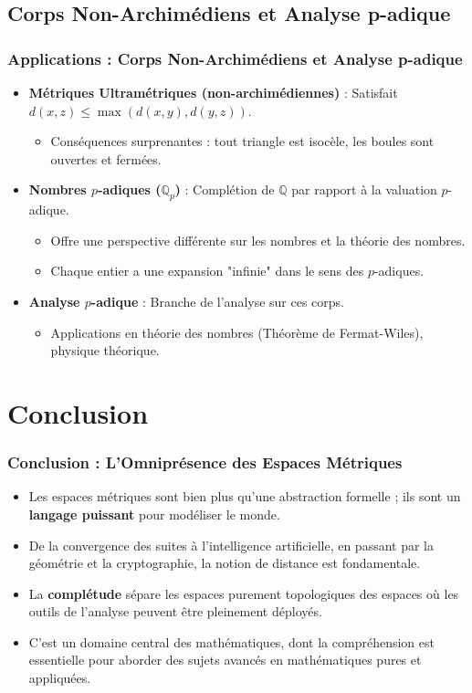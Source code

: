 \documentclass{beamer}
\begin{document}
\subsection*{Corps Non-Archimédiens et Analyse p-adique}
\begin{frame}
    \frametitle{Applications : Corps Non-Archimédiens et Analyse p-adique}
    \begin{itemize}
        \item \textbf{Métriques Ultramétriques (non-archimédiennes)} : Satisfait $d(x, z) \le \max(d(x, y), d(y, z))$.
            \begin{itemize}
                \item Conséquences surprenantes : tout triangle est isocèle, les boules sont ouvertes et fermées.
            \end{itemize}
        \item \textbf{Nombres $p$-adiques ($\mathbb{Q}_p$)} : Complétion de $\mathbb{Q}$ par rapport à la valuation $p$-adique.
            \begin{itemize}
                \item Offre une perspective différente sur les nombres et la théorie des nombres.
                \item Chaque entier a une expansion "infinie" dans le sens des $p$-adiques.
            \end{itemize}
        \item \textbf{Analyse $p$-adique} : Branche de l'analyse sur ces corps.
            \begin{itemize}
                \item Applications en théorie des nombres (Théorème de Fermat-Wiles), physique théorique.
            \end{itemize}
    \end{itemize}
\end{frame}

\section*{Conclusion}
\begin{frame}
    \frametitle{Conclusion : L'Omniprésence des Espaces Métriques}
    \begin{itemize}
        \item Les espaces métriques sont bien plus qu'une abstraction formelle ; ils sont un \textbf{langage puissant} pour modéliser le monde.
        \item De la convergence des suites à l'intelligence artificielle, en passant par la géométrie et la cryptographie, la notion de distance est fondamentale.
        \item La \textbf{complétude} sépare les espaces purement topologiques des espaces où les outils de l'analyse peuvent être pleinement déployés.
        \item C'est un domaine central des mathématiques, dont la compréhension est essentielle pour aborder des sujets avancés en mathématiques pures et appliquées.
    \end{itemize}
\end{frame}
\end{document}
